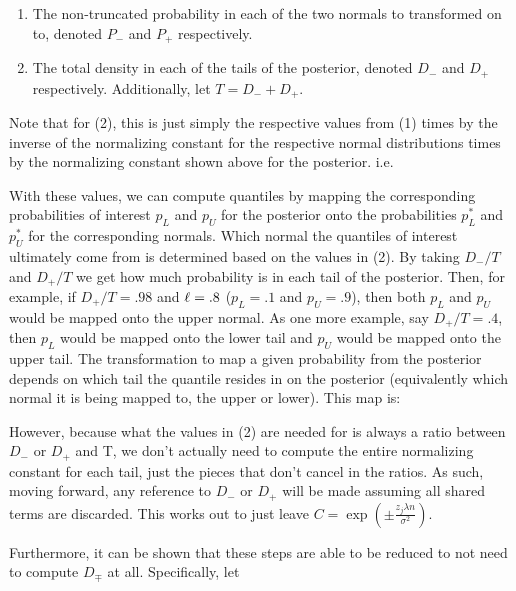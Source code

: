 \begin{enumerate}
\item The non-truncated probability in each of the two normals to transformed on to, denoted $P_{-}$ and $P_{+}$ respectively.
\item The total density in each of the tails of the posterior, denoted $D_{-}$ and $D_{+}$ respectively. Additionally, let $T = D_{-} + D_{+}$.
\end{enumerate} 

Note that for (2), this is just simply the respective values from (1) times by the inverse of the normalizing constant for the respective normal distributions times by the normalizing constant shown above for the posterior. i.e.


With these values, we can compute quantiles by mapping the corresponding probabilities of interest $p_{L}$ and $p_{U}$ for the posterior onto the probabilities $p^*_{L}$ and $p^*_{U}$ for the corresponding normals. Which normal the quantiles of interest ultimately come from is determined based on the values in (2). By taking  $D_{-} / T$ and $D_{+} / T$ we get how much probability is in each tail of the posterior. Then, for example, if $D_{+} / T = .98$ and $\ell = .8$ ($p_{L} = .1$ and $p_{U} = .9$), then both $p_{L}$ and $p_{U}$ would be mapped onto the upper normal. As one more example, say $D_{+} / T = .4$, then $p_{L}$ would be mapped onto the lower tail and $p_{U}$ would be mapped onto the upper tail. The transformation to map a given probability from the posterior depends on which tail the quantile resides in on the posterior (equivalently which normal it is being mapped to, the upper or lower). This map is:


However, because what the values in (2) are needed for is always a ratio between $D_{-}$ or $D_{+}$ and T, we don't actually need to compute the entire normalizing constant for each tail, just the pieces that don't cancel in the ratios. As such, moving forward, any reference to $D_{-}$ or $D_{+}$ will be made assuming all shared terms are discarded. This works out to just leave $C = \exp(\pm \frac{z_j \lambda n}{\sigma^2})$. 

Furthermore, it can be shown that these steps are able to be reduced to not need to compute $D_{\mp}$ at all. Specifically, let

